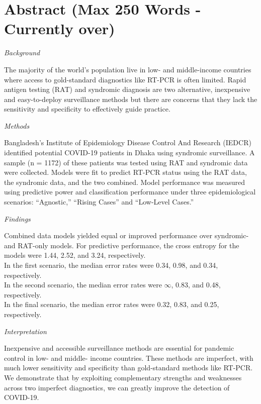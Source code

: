 \documentclass[]{elsarticle} %
\begin{document}
\hypertarget{abstract-max-250-words---currently-over}{%
\section{Abstract (Max 250 Words - Currently over)}\label{abstract-max-250-words---currently-over}}

\emph{Background}

The majority of the world's population live in low- and middle-income countries where access to gold-standard diagnostics like RT-PCR is often limited.
Rapid antigen testing (RAT) and syndromic diagnosis are two alternative, inexpensive and easy-to-deploy surveillance methods but there are concerns that they lack the sensitivity and specificity to effectively guide practice.

\emph{Methods}

Bangladesh's Institute of Epidemiology Disease Control And Research (IEDCR) identified potential COVID-19 patients in Dhaka using syndromic surveillance.
A sample (n = 1172) of these patients was tested using RAT and syndromic data were collected.
Models were fit to predict RT-PCR status using the RAT data, the syndromic data, and the two combined.
Model performance was measured using predictive power and classification performance under three epidemiological scenarios: ``Agnostic,'' ``Rising Cases'' and ``Low-Level Cases.''

\emph{Findings}

Combined data models yielded equal or improved performance over syndromic- and RAT-only models.
For predictive performance, the cross entropy for the models were 1.44, 2.52, and 3.24, respectively.\\
In the first scenario, the median error rates were 0.34, 0.98, and 0.34, respectively.\\
In the second scenario, the median error rates were \ensuremath{\infty{}}, 0.83, and 0.48, respectively.\\
In the final scenario, the median error rates were 0.32, 0.83, and 0.25, respectively. 

\emph{Interpretation}

Inexpensive and accessible surveillance methods are essential for pandemic control in low- and middle- income countries.
These methods are imperfect, with much lower sensitivity and specificity than gold-standard methods like RT-PCR.
We demonstrate that by exploiting complementary strengths and weaknesses across two imperfect diagnostics, we can greatly improve the detection of COVID-19.
\end{document}
